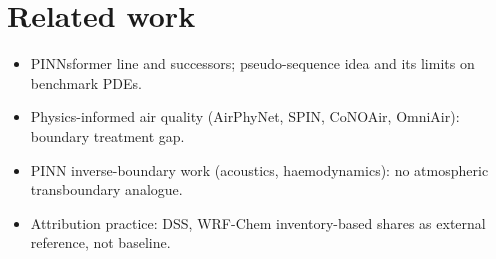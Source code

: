 \section{Related work}
\begin{itemize}
  \item PINNsformer line and successors; pseudo-sequence idea and its limits on benchmark PDEs.
  \item Physics-informed air quality (AirPhyNet, SPIN, CoNOAir, OmniAir): boundary treatment gap.
  \item PINN inverse-boundary work (acoustics, haemodynamics): no atmospheric transboundary analogue.
  \item Attribution practice: DSS, WRF-Chem inventory-based shares as external reference, not baseline.
\end{itemize}

